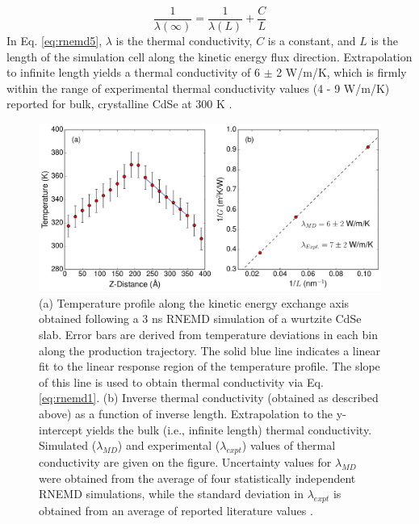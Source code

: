 \begin{equation} \label{eq:rnemd5}
\frac{1}{\lambda\left(\infty\right)} = \frac{1}{\lambda\left(L\right)} + \frac{C}{L}
\end{equation}
In Eq. \ref{eq:rnemd5}, $\lambda$ is the thermal conductivity, $C$ is a constant, and $L$ is the length of the simulation cell along the kinetic energy flux direction. Extrapolation to infinite length yields a thermal conductivity of 6 $\pm$ 2 W/m/K, which is firmly within the range of experimental thermal conductivity values (4 - 9 W/m/K) reported for bulk, crystalline CdSe at 300 K \cite{berger1996semiconductor, PhysRevB.6.3791, doi:10.1021/nl400531f}.  \par

\begin{figure}
\begin{center}
\includegraphics[width=\textwidth]{./Chapter4/rnemd1.pdf}
\caption[Determination of thermal conductivity in bulk CdSe via MD simulation.]{(a) Temperature profile along the kinetic energy exchange axis obtained following a 3 ns RNEMD simulation of a wurtzite CdSe slab. Error bars are derived from temperature deviations in each bin along the production trajectory. The solid blue line indicates a linear fit to the linear response region of the temperature profile. The slope of this line is used to obtain thermal conductivity via Eq. \ref{eq:rnemd1}.  (b) Inverse thermal conductivity (obtained as described above) as a function of inverse length. Extrapolation to the y-intercept yields the bulk (i.e., infinite length) thermal conductivity. Simulated ($\lambda_{MD}$) and experimental ($\lambda_{expt}$) values of thermal conductivity are given on the figure. Uncertainty values for $\lambda_{MD}$ were obtained from the average of four statistically independent RNEMD simulations, while the standard deviation in $\lambda_{expt}$ is obtained from an average of reported literature values \cite{berger1996semiconductor, PhysRevB.6.3791, doi:10.1021/nl400531f}.}
\label{f:rnemd1}
\end{center}
\end{figure}

